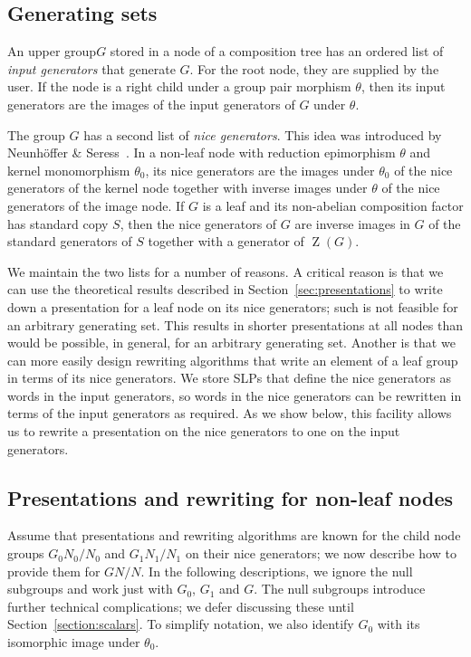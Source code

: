 \documentclass[12pt,twoside,reqno,psamsfonts]{amsproc}
\newcommand{\uppergp}{{upper group}\xspace}
\newcommand{\nullsubgp}{{null subgroup}\xspace}
\numberwithin{equation}{section}
\numberwithin{figure}{section}
\newcounter{algorithm}
\theoremstyle{plain}
\theoremstyle{definition}
\theoremstyle{remark}
\DeclareMathOperator{\Zent}{Z}
\begin{document}
\subsection{Generating sets}
\label{subsec:generators}
An \uppergp $G$ stored in a node of a composition tree has 
an ordered list of {\em input generators}
that generate $G$. For the root node, they are supplied by the user. 
If the node is a right child under a group pair morphism $\theta$, 
then its input generators are the images of the input 
generators of $G$ under $\theta$.

The group $G$ has a second list of \emph{nice generators}.
This idea was introduced by Neunh\"offer \& Seress~\cite{MR2289128}.
In a non-leaf node with reduction epimorphism $\theta$ and kernel monomorphism
$\theta_0$, its nice generators are the images under $\theta_0$ of the nice
generators of
the kernel node together with inverse images under $\theta$ of the nice
generators of the image node. 
If $G$ is a leaf and its non-abelian composition factor
has standard copy $S$, 
then the nice generators of $G$ are inverse images in $G$ of 
the standard generators 
of $S$ together with a generator of $\Zent(G)$.

We maintain the two lists for a number of reasons.
A critical reason is that we can use the theoretical results 
described in Section~\ref{sec:presentations}
to write down a presentation for a leaf node on its nice generators;
such is not feasible for an arbitrary generating set. 
This results in shorter presentations at all nodes
than would be possible, in general, for an arbitrary generating set.
Another is that we can more easily design rewriting algorithms 
that write an element of a leaf group in terms of its nice generators.
We store SLPs that define the nice generators as words in the input
generators, so words in the nice generators can be rewritten in terms
of the input generators as required. As we show below, this facility 
allows us to rewrite a presentation on the nice generators to one 
on the input generators.

\subsection{Presentations and rewriting for non-leaf nodes}
\label{subsec:presnonleaf}
Assume that presentations and rewriting algorithms are known for
the child node groups $G_0N_0/N_0$ and $G_1N_1/N_1$ on their nice
generators; we now describe how to provide them for $GN/N$. In the following
descriptions, we ignore the {\nullsubgp}s and work just with
$G_0$, $G_1$ and $G$. The {\nullsubgp}s introduce further technical
complications; we defer discussing these until 
Section~\ref{section:scalars}.
To simplify notation, we also identify $G_0$ with its isomorphic
image under $\theta_0$.
\end{document}
